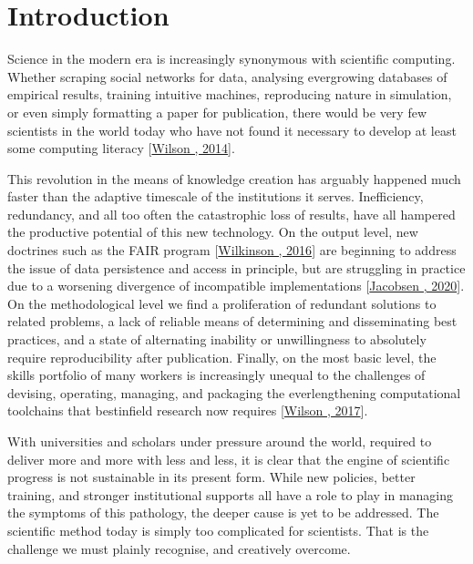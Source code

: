 \documentclass[letterpaper,10pt,english]{jupyterBook}
\begin{document}
\section{Introduction}
\label{\detokenize{content/chapter_03_everest/introduction:introduction}}\label{\detokenize{content/chapter_03_everest/introduction::doc}}
\sphinxAtStartPar
Science in the modern era is increasingly synonymous with scientific computing. Whether scraping social networks for data, analysing ever\sphinxhyphen{}growing databases of empirical results, training intuitive machines, reproducing nature in simulation, or even simply formatting a paper for publication, there would be very few scientists in the world today who have not found it necessary to develop at least some computing literacy {[}\hyperlink{cite.references:id929}{Wilson , 2014}{]}.

\sphinxAtStartPar
This revolution in the means of knowledge creation has arguably happened much faster than the adaptive timescale of the institutions it serves. Inefficiency, redundancy, and \sphinxhyphen{} all too often \sphinxhyphen{} the catastrophic loss of results, have all hampered the productive potential of this new technology. On the output level, new doctrines such as the FAIR program {[}\hyperlink{cite.references:id940}{Wilkinson , 2016}{]} are beginning to address the issue of data persistence and access in principle, but are struggling in practice due to a worsening divergence of incompatible implementations {[}\hyperlink{cite.references:id941}{Jacobsen , 2020}{]}. On the methodological level we find a proliferation of redundant solutions to related problems, a lack of reliable means of determining and disseminating best practices, and a state of alternating inability or unwillingness to absolutely require reproducibility after publication. Finally, on the most basic level, the skills portfolio of many workers is increasingly unequal to the challenges of devising, operating, managing, and packaging the ever\sphinxhyphen{}lengthening computational toolchains that best\sphinxhyphen{}in\sphinxhyphen{}field research now requires {[}\hyperlink{cite.references:id930}{Wilson , 2017}{]}.

\sphinxAtStartPar
With universities and scholars under pressure around the world, required to deliver more and more with less and less, it is clear that the engine of scientific progress is not sustainable in its present form. While new policies, better training, and stronger institutional supports all have a role to play in managing the symptoms of this pathology, the deeper cause is yet to be addressed. The scientific method today is simply too complicated for scientists. That is the challenge we must plainly recognise, and creatively overcome.
\end{document}
